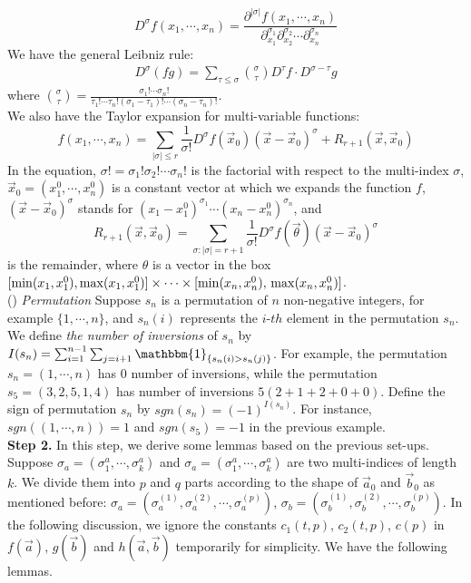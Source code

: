 \documentclass[12pt]{article}
\begin{document}
$$D^{\sigma}f(x_{1},\cdots,x_{n})=\frac{\partial^{|\sigma|}f(x_{1},\cdots,x_{n})}{\partial_{x_{1}}^{\sigma_{1}}\partial_{x_{2}}^{\sigma_{2}}\cdots \partial_{x_{n}}^{\sigma_{n}}}$$ We have the general Leibniz rule:
\begin{align*}
	D^{\sigma}(fg)=\sum_{\tau\leqslant\sigma}\binom{\sigma}{\tau}D^{\tau}f\cdot D^{\sigma-\tau}g
\end{align*}
where $\binom{\sigma}{\tau}=\frac{\sigma_{1}!\cdots\sigma_{n}!}{\tau_{1}!\cdots\tau_{n}!(\sigma_{1}-\tau_{1})!\cdots(\sigma_{n}-\tau_{n})!}$.\\
We also have the Taylor expansion for multi-variable functions:
$$f(x_{1},\cdots,x_{n})=\sum_{|\sigma|\leqslant r}\frac{1}{\sigma!}D^{\sigma}f(\vec{x}_{0})(\vec{x}-\vec{x}_{0})^{\sigma}+R_{r+1}(\vec{x},\vec{x}_{0})$$ 
In the equation, $\sigma!=\sigma_{1}!\sigma_{2}!\cdots\sigma_{n}!$ is the factorial with respect to the multi-index $\sigma$, $\vec{x}_{0}=(x_{1}^{0},\cdots,x_{n}^{0})$ is a constant vector at which we expands the function $f$, $(\vec{x}-\vec{x}_{0})^{\sigma}$ stands for $(x_{1}-x_{1}^{0})^{\sigma_{1}}\cdots(x_{n}-x_{n}^{0})^{\sigma_{n}}$, and $$R_{r+1}(\vec{x},\vec{x}_{0})=\sum_{\sigma:|\sigma|=r+1}\frac{1}{\sigma!}D^{\sigma}f(\vec{\theta})(\vec{x}-\vec{x}_{0})^{\sigma}$$ is the remainder, where $\theta$ is a vector in the box $[\min (x_{1},x_{1}^{0}),\max (x_{1},x_{1}^{0})]\times\cdots\times[\min (x_{n},x_{n}^{0}),\\ \max (x_{n},x_{n}^{0})]$.\\
() \emph{Permutation} Suppose $s_{n}$ is a permutation of $n$ non-negative integers, for example $\{1,\cdots,n\}$, and $s_{n}(i)$ represents the $i$-$th$ element in the permutation $s_{n}$. We define \emph{the number of inversions} of $s_{n}$ by $I(s_{n})=\sum_{i=1}^{n-1}\sum_{j=i+1}\mathbbm{1}_{\{s_{n}(i)>s_{n}(j)\}}$. For example, the permutation $s_{n}=(1,\cdots,n)$ has $0$ number of inversions, while the permutation $s_{5}=(3,2,5,1,4)$ has number of inversions $5(2+1+2+0+0)$. Define the sign of permutation $s_{n}$ by $sgn(s_{n})=(-1)^{I(s_{n})}$. For instance, $sgn((1,\cdots,n))=1$ and $sgn(s_{5})=-1$ in the previous example.\\
\textbf{Step 2. }In this step, we derive some lemmas based on the previous set-ups. Suppose $\sigma_{a}=(\sigma_{1}^{a},\cdots,\sigma_{k}^{a})$ and $\sigma_{a}=(\sigma_{1}^{a},\cdots,\sigma_{k}^{a})$ are two multi-indices of length $k$. We divide them into $p$ and $q$ parts according to the shape of $\vec{a}_{0}$ and $\vec{b}_{0}$ as mentioned before: $\sigma_{a}=(\sigma^{(1)}_{a},\sigma^{(2)}_{a},\cdots,\sigma^{(p)}_{a})$, $\sigma_{b}=(\sigma^{(1)}_{b},\sigma^{(2)}_{b},\cdots,\sigma^{(p)}_{b})$. In the following discussion, we ignore the constants $c_{1}(t,p)$, $c_{2}(t,p)$, $c(p)$ in $f(\vec{a})$, $g(\vec{b})$ and $h(\vec{a},\vec{b})$ temporarily for simplicity. We have the following lemmas.\\
\end{document}
